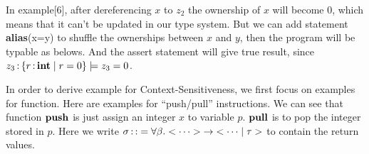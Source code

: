 \documentclass[runningheads]{llncs}
\begin{document}
In example[6], after dereferencing $x$ to $z_2$ the ownership of $x$ will become 0, which means that
it can't be updated in our type system. But we can add statement \textbf{alias}(x=y)
to shuffle the ownerships between $x$ and $y$, then the program will be typable as belows. And the assert
statement will give true result, since $z_3 \operatorname{:} \left\{{r \operatorname{:} \mathbf{int} \mid r = 0}\right\}\models z_3 = 0$.

\begin{parcolumns}{2}
\colplacechunks
\end{parcolumns}

In order to derive example for Context-Sensitiveness, we first focus on examples for function. Here are examples for “push/pull” instructions.
We can see that function $\bf{push}$ is just assign an integer $x$ to variable $p$. $\bf{pull}$ is to pop the integer stored in $p$. Here we write
$\sigma \operatorname{:}\operatorname{:}= \forall \beta.<\dots>\operatorname{\rightarrow} <\dots\mid\tau>$ to contain the return values.
\end{document}
